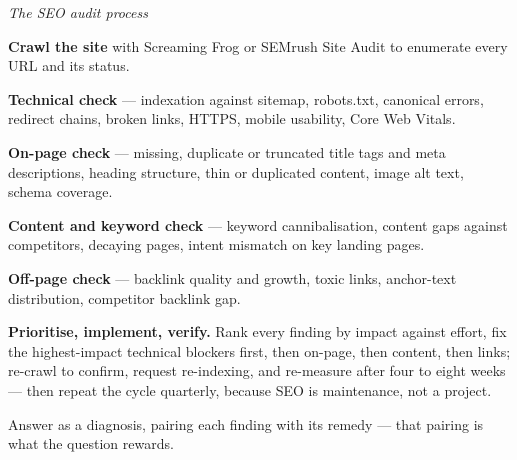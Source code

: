 \begin{qlist}
\textit{The SEO audit process}
\begin{apts}\setcounter{enumi}{4}
\item \textbf{Crawl the site} with Screaming Frog or SEMrush Site Audit to
      enumerate every URL and its status.
\item \textbf{Technical check} --- indexation against sitemap, robots.txt,
      canonical errors, redirect chains, broken links, HTTPS, mobile usability,
      Core Web Vitals.
\item \textbf{On-page check} --- missing, duplicate or truncated title tags and
      meta descriptions, heading structure, thin or duplicated content, image
      alt text, schema coverage.
\item \textbf{Content and keyword check} --- keyword cannibalisation, content
      gaps against competitors, decaying pages, intent mismatch on key landing
      pages.
\item \textbf{Off-page check} --- backlink quality and growth, toxic links,
      anchor-text distribution, competitor backlink gap.
\item \textbf{Prioritise, implement, verify.} Rank every finding by impact
      against effort, fix the highest-impact technical blockers first, then
      on-page, then content, then links; re-crawl to confirm, request
      re-indexing, and re-measure after four to eight weeks --- then repeat the
      cycle quarterly, because SEO is maintenance, not a project.
\end{apts}

Answer as a diagnosis, pairing each finding with its remedy --- that pairing is
what the question rewards.


\end{qlist}
